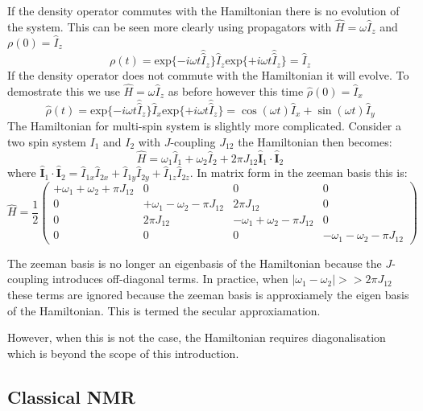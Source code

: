 If the density operator commutes with the Hamiltonian there is no evolution of the system.
This can be seen more clearly using propagators with $\hat{H} = \omega\hat{I}_z$ and $\rho(0) = \hat{I}_z$
\begin{equation}
  \rho(t) = \text{exp}\{-i\omega t\hat{\hat{I}}_z\}\hat{I}_z\text{exp}\{+i\omega t\hat{\hat{I}}_z\} = \hat{I}_z
\end{equation}
If the density operator does not commute with the Hamiltonian it will evolve. To demostrate this we use
$\hat{H} = \omega\hat{I}_z$ as before  however this time $\hat\rho(0) = \hat{I}_x$
\begin{equation}
  \hat\rho(t) = \text{exp}\{-i\omega t\hat{\hat{I}}_z\}\hat{I}_x\text{exp}\{+i\omega t\hat{\hat{I}}_z\} = \cos(\omega t)\hat{I}_x + \sin(\omega t)\hat{I}_y
\end{equation}
The Hamiltonian for multi-spin system is slightly more complicated. Consider a two spin
system $I_1$ and $I_2$ with $J$-coupling $J_{12}$ the Hamiltonian then becomes:
\begin{equation}
  \hat{H} = \omega_1\hat{I}_1 + \omega_2\hat{I}_2 + 2\pi J_{12}\hat{\mathbf{I}}_1\cdot\hat{\mathbf{I}}_2
\end{equation}
where $\hat{\mathbf{I}}_1\cdot\hat{\mathbf{I}}_2 = \hat{I}_{1x}\hat{I}_{2x} + \hat{I}_{1y}\hat{I}_{2y} + \hat{I}_{1z}\hat{I}_{2z}$.
In matrix form in the zeeman basis this is:
\begin{equation}
  \hat{H} = \frac{1}{2}\begin{pmatrix}
    +\omega_1 + \omega_2 + \pi J_{12} & 0 & 0 & 0\\
    0 & +\omega_1 - \omega_2 - \pi J_{12} & 2\pi J_{12} & 0\\
    0 & 2\pi J_{12} & -\omega_1 + \omega_2 - \pi J_{12} & 0\\
    0 & 0 & 0 & -\omega_1 - \omega_2 - \pi J_{12}
\end{pmatrix}
\end{equation}

The zeeman basis is no longer an eigenbasis of the Hamiltonian because the $J$-coupling
introduces off-diagonal terms. In practice, when $|\omega_1-\omega_2| >> 2\pi J_{12}$
these terms are ignored because the zeeman basis is approxiamely the eigen basis of the Hamiltonian. This is termed the secular approxiamation.

However, when this is not the case, the Hamiltonian requires diagonalisation which is beyond the scope of this introduction.

\subsection{Classical NMR}

